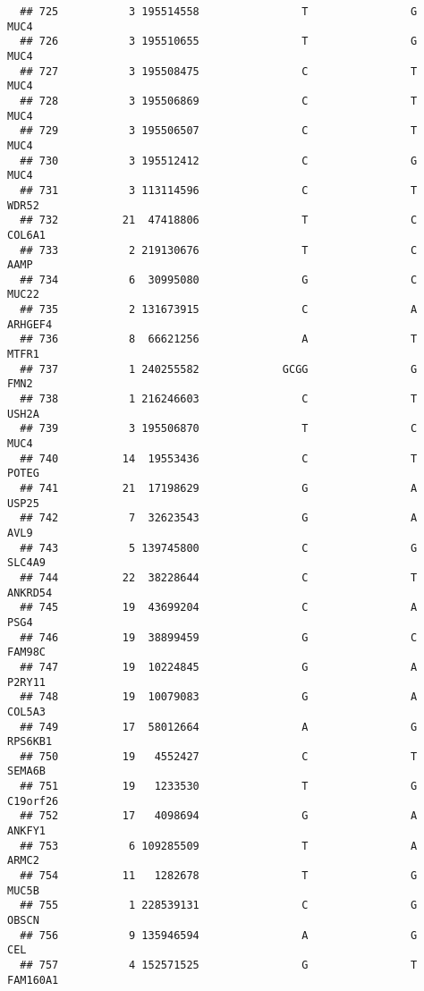 \documentclass[12pt,twoside]{reedthesis}
\theoremstyle{definition}
\theoremstyle{definition}
\theoremstyle{remark}
\begin{document}
\begin{verbatim}
  ## 725           3 195514558                T                G           MUC4
  ## 726           3 195510655                T                G           MUC4
  ## 727           3 195508475                C                T           MUC4
  ## 728           3 195506869                C                T           MUC4
  ## 729           3 195506507                C                T           MUC4
  ## 730           3 195512412                C                G           MUC4
  ## 731           3 113114596                C                T          WDR52
  ## 732          21  47418806                T                C         COL6A1
  ## 733           2 219130676                T                C           AAMP
  ## 734           6  30995080                G                C          MUC22
  ## 735           2 131673915                C                A        ARHGEF4
  ## 736           8  66621256                A                T          MTFR1
  ## 737           1 240255582             GCGG                G           FMN2
  ## 738           1 216246603                C                T          USH2A
  ## 739           3 195506870                T                C           MUC4
  ## 740          14  19553436                C                T          POTEG
  ## 741          21  17198629                G                A          USP25
  ## 742           7  32623543                G                A           AVL9
  ## 743           5 139745800                C                G         SLC4A9
  ## 744          22  38228644                C                T        ANKRD54
  ## 745          19  43699204                C                A           PSG4
  ## 746          19  38899459                G                C         FAM98C
  ## 747          19  10224845                G                A         P2RY11
  ## 748          19  10079083                G                A         COL5A3
  ## 749          17  58012664                A                G        RPS6KB1
  ## 750          19   4552427                C                T         SEMA6B
  ## 751          19   1233530                T                G       C19orf26
  ## 752          17   4098694                G                A         ANKFY1
  ## 753           6 109285509                T                A          ARMC2
  ## 754          11   1282678                T                G          MUC5B
  ## 755           1 228539131                C                G          OBSCN
  ## 756           9 135946594                A                G            CEL
  ## 757           4 152571525                G                T       FAM160A1

\end{verbatim}
\end{document}
